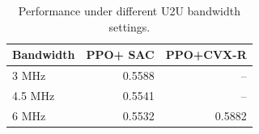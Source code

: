 \begin{table}[tbp]
\centering
\caption{Performance under different U2U bandwidth settings.}
\label{tab:bandwidth_sensitivity}
\begin{tabular}{@{}lrr@{}}
\toprule
Bandwidth & PPO+ SAC & PPO+CVX-R \\
\midrule
3 MHz & 0.5588 & -- \\
4.5 MHz & 0.5541 & -- \\
6 MHz & 0.5532 & 0.5882 \\
\bottomrule
\end{tabular}
\end{table}

